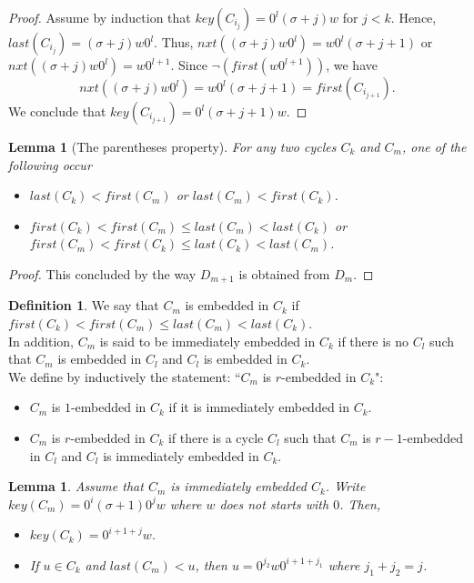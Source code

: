 \documentclass{article}
\newtheorem{lemma}[theorem]{Lemma}
\theoremstyle{definition}
\newtheorem{definition}[theorem]{Definition}
\begin{document}
\begin{proof}
	Assume by induction that $key(C_{i_j})=0^l(\sigma+j)w$ for $j<k$. Hence, $last(C_{i_j})=(\sigma+j)w0^l$. Thus, $nxt((\sigma+j)w0^l)=w0^l(\sigma+j+1)$ or $nxt((\sigma+j)w0^l)=w0^{l+1}$. Since $\neg(first(w0^{l+1}))$, we have 
	$$nxt((\sigma+j)w0^l)=w0^l(\sigma+j+1)=first(C_{i_{j+1}}).$$
	We conclude that $key(C_{i_{j+1}})=0^l(\sigma+j+1)w$.
\end{proof}

\begin{lemma}[The parentheses property]
	\label{parenthesis}
	For any two cycles $C_k$ and $C_m$, one of the following occur
	\begin{itemize}
		\item $last(C_k)<first(C_m)$ or $last(C_m)<first(C_k)$.
		
		\item $first(C_k)<first(C_m)\leq last(C_m)<last(C_k)$ or \\
		$first(C_m)<first(C_k)\leq last(C_k)<last(C_m)$.
	\end{itemize}
\end{lemma}
\begin{proof}
	This concluded by the way $D_{m+1}$ is obtained from $D_m$.
\end{proof}

\begin{definition}
	We say that $C_m$ is embedded in $C_k$ if $first(C_k)<first(C_m)\leq last(C_m)<last(C_k)$.\\ 
	In addition, $C_m$ is said to be immediately embedded in $C_k$ if there is no $C_l$ such that $C_m$ is embedded in $C_l$ and $C_l$ is embedded in $C_k$.\\ 
	We define by inductively the statement: ``$C_m$ is $r$-embedded in $C_k$":
	\begin{itemize}
		\item $C_m$ is $1$-embedded in $C_k$ if it is immediately embedded in $C_k$.
		\item $C_m$ is $r$-embedded in $C_k$ if there is a cycle $C_l$ such that $C_m$ is $r-1$-embedded in $C_l$ and $C_l$ is immediately embedded in $C_k$. 
	\end{itemize} 
\end{definition}

\begin{lemma}
	\label{embedding-properties}
	Assume that $C_m$ is immediately embedded $C_k$. Write $key(C_m)=0^i(\sigma+1)0^jw$ where $w$ does not starts with $0$. Then,
	\begin{itemize}
		\item $key(C_k) =0^{i+1+j}w$.
		\item If $u\in C_k$ and $last(C_m)<u$, then $u=0^{j_2}w0^{i+1+j_1}$ where $j_1+j_2=j$. 
	\end{itemize}
\end{lemma}
\end{document}
